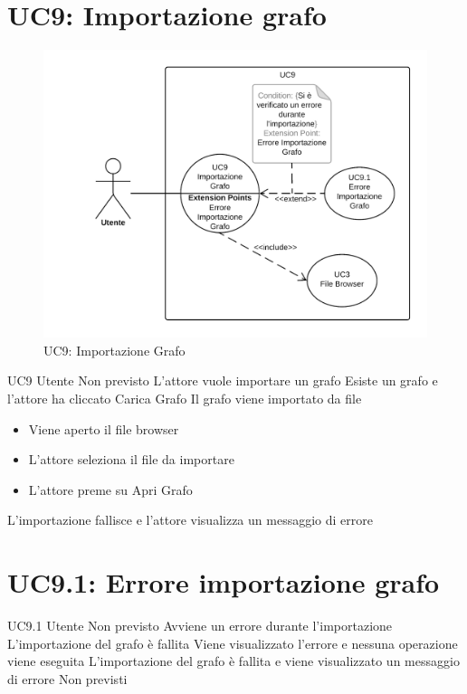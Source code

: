 \documentclass[../AnalisideiRequisiti.tex]{subfiles}
\begin{document}
\section{UC9: Importazione grafo}
\begin{figure}[H]
	\centering
	\includegraphics[width=\textwidth]{../img/UC9.png}
	\caption{UC9: Importazione Grafo}
\end{figure}
\UserCase
{UC9}
{Utente}
{Non previsto}
{L'attore vuole importare un grafo}
{Esiste un grafo e l'attore ha cliccato Carica Grafo}
{Il grafo viene importato da file}
{
	\begin{itemize}
			\item{} Viene aperto il file browser 
			\item{} L'attore seleziona il file da importare 
			\item{} L'attore preme su Apri Grafo
	\end{itemize}
}
{L'importazione fallisce e l'attore visualizza un messaggio di errore }

\section{UC9.1: Errore importazione grafo}
\UserCase
{UC9.1}
{Utente}
{Non previsto}
{Avviene un errore durante l'importazione}
{L'importazione del grafo è fallita}
{Viene visualizzato l'errore e nessuna operazione viene eseguita}
{L'importazione del grafo è fallita e viene visualizzato un messaggio di errore}
{Non previsti}
\end{document}
